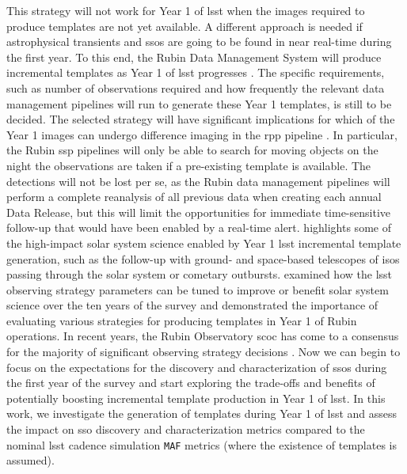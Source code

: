 \documentclass[preprintm,linenumbers]{aastex631}
\newcommand{\maf}{\texttt{MAF}\xspace}
\begin{document}
This strategy will not work for Year 1 of \gls*{lsst} when the images required to produce templates are not yet available.  A different approach is needed if astrophysical transients and \glspl*{sso} are going to be found in near real-time during the first year. To this end, the Rubin Data Management System will produce incremental templates as Year 1 of \gls*{lsst} progresses \citep{RTN-011}. %
	The specific requirements, such as number of observations required and how frequently the relevant data management pipelines will run to generate these Year 1 templates, is still to be decided. The selected strategy will have significant implications for which of the Year 1 images can undergo difference imaging in the \gls*{rpp} pipeline \citep{DMTN-107,RTN-011}. 
	In particular, the Rubin \gls*{ssp} pipelines will only be able to search for moving objects on the night the observations are taken if a pre-existing template is available. 
	The detections will not be lost per se, as the Rubin data management pipelines will perform a complete reanalysis of all previous data when creating each annual Data Release, but this will limit the opportunities for immediate time-sensitive follow-up that would have been enabled by a real-time alert. 
 \cite{2021RNAAS...5..143S} highlights some of the high-impact solar system science enabled by Year 1 \gls*{lsst} incremental template generation, such as the follow-up with ground- and space-based telescopes of \glspl*{iso} passing through the solar system or cometary outbursts. 
	\cite{schwambTuningLegacySurvey2023} examined how the \gls*{lsst} observing strategy parameters can be tuned to improve or benefit solar system science over the ten years of the survey and demonstrated the importance of evaluating various strategies for producing templates in Year 1 of Rubin operations. 
 In recent years, the Rubin Observatory \gls*{scoc} has come to a consensus for the majority of significant observing strategy decisions \citep{SCOC_Report_1, SCOC_Report_2}. Now we can begin to focus on the expectations for the discovery and characterization of \glspl*{sso} during the first year of the survey and start exploring the trade-offs and benefits of potentially boosting incremental template production in Year 1 of \gls*{lsst}. 
 In this work, we investigate the generation of templates during Year 1 of \gls*{lsst} and assess the impact on \gls*{sso} discovery and characterization metrics compared to the nominal \gls*{lsst} cadence simulation \maf metrics  (where the existence of templates is assumed). 
\end{document}
